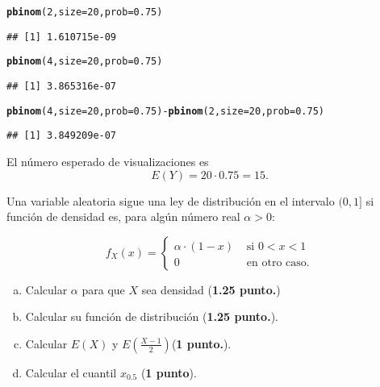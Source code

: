 \documentclass[12pt]{article}\usepackage[]{graphicx}\usepackage[]{color}
\makeatletter
\newcommand{\hlnum}[1]{\textcolor[rgb]{0.686,0.059,0.569}{#1}}%
\newcommand{\hlopt}[1]{\textcolor[rgb]{0,0,0}{#1}}%
\newcommand{\hlstd}[1]{\textcolor[rgb]{0.345,0.345,0.345}{#1}}%
\newcommand{\hlkwc}[1]{\textcolor[rgb]{0.333,0.667,0.333}{#1}}%
\newcommand{\hlkwd}[1]{\textcolor[rgb]{0.737,0.353,0.396}{\textbf{#1}}}%
\newenvironment{kframe}{%
 \def\at@end@of@kframe{}%
 \ifinner\ifhmode%
  \def\at@end@of@kframe{\end{minipage}}%
  \begin{minipage}{\columnwidth}%
 \fi\fi%
 \def\FrameCommand##1{\hskip\@totalleftmargin \hskip-\fboxsep
 \colorbox{shadecolor}{##1}\hskip-\fboxsep
     \hskip-\linewidth \hskip-\@totalleftmargin \hskip\columnwidth}%
 \MakeFramed {\advance\hsize-\width
   \@totalleftmargin\z@ \linewidth\hsize
   \@setminipage}}%
 {\par\unskip\endMakeFramed%
 \at@end@of@kframe}
\newenvironment{knitrout}{}{} %
\newcounter{problemes}
\newcounter{punts} \def\thepunts{\arabic{punts}}
\def\probl{\addtocounter{problemes}{1} \setcounter{punts}{0}
\medskip\noindent{\bf \theproblemes) }}
\makeatother
\begin{document}
\begin{knitrout}
\color{fgcolor}\begin{kframe}
\begin{alltt}
\hlkwd{pbinom}\hlstd{(}\hlnum{2}\hlstd{,}\hlkwc{size}\hlstd{=}\hlnum{20}\hlstd{,}\hlkwc{prob}\hlstd{=}\hlnum{0.75}\hlstd{)}
\end{alltt}
\begin{verbatim}
## [1] 1.610715e-09
\end{verbatim}
\begin{alltt}
\hlkwd{pbinom}\hlstd{(}\hlnum{4}\hlstd{,}\hlkwc{size}\hlstd{=}\hlnum{20}\hlstd{,}\hlkwc{prob}\hlstd{=}\hlnum{0.75}\hlstd{)}
\end{alltt}
\begin{verbatim}
## [1] 3.865316e-07
\end{verbatim}
\begin{alltt}
\hlkwd{pbinom}\hlstd{(}\hlnum{4}\hlstd{,}\hlkwc{size}\hlstd{=}\hlnum{20}\hlstd{,}\hlkwc{prob}\hlstd{=}\hlnum{0.75}\hlstd{)}\hlopt{-}\hlkwd{pbinom}\hlstd{(}\hlnum{2}\hlstd{,}\hlkwc{size}\hlstd{=}\hlnum{20}\hlstd{,}\hlkwc{prob}\hlstd{=}\hlnum{0.75}\hlstd{)}
\end{alltt}
\begin{verbatim}
## [1] 3.849209e-07
\end{verbatim}
\end{kframe}
\end{knitrout}

El número esperado de visualizaciones es 
$$E(Y)=20\cdot 0.75=15.$$

\probl Una variable aleatoria sigue una ley   de distribución  en el intervalo $(0,1]$ si función de densidad es, para algún número real $\alpha>0$:

$$
f_X(x)=\left\{
\begin{array}{ll}
\alpha \cdot (1-x)  & \mbox{ si } 0 < x < 1 \\
0 & \mbox{ en otro caso.}
\end{array}
\right.
$$

\begin{enumerate}[a)]
\item Calcular $\alpha$ para que $X$ sea densidad (\textbf{1.25 punto.})
\item Calcular su función de distribución (\textbf{1.25 punto.}).
\item Calcular $E(X)$ y $E\left(\frac{X-1}{2}\right)$(\textbf{1 punto.}).
\item Calcular el cuantil $x_{0.5}$ (\textbf{1 punto}).
\end{enumerate}
\end{document}
